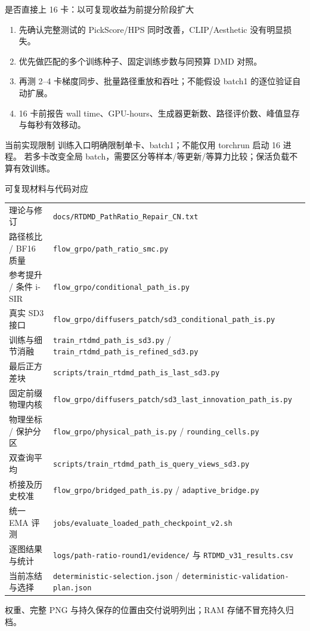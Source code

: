 \documentclass[10pt,aspectratio=169]{beamer}
\begin{document}
\begin{frame}{是否直接上 16 卡：以可复现收益为前提分阶段扩大}
\small
\begin{enumerate}\itemsep6pt
\item 先确认完整测试的 PickScore/HPS 同时改善，CLIP/Aesthetic 没有明显损失。
\item 优先做匹配的多个训练种子、固定训练步数与同预算 DMD 对照。
\item 再测 2--4 卡梯度同步、批量路径重放和吞吐；不能假设 batch1 的逐位验证自动扩展。
\item 16 卡前报告 wall time、GPU-hours、生成器更新数、路径评价数、峰值显存与每秒有效移动。
\end{enumerate}
\begin{alertblock}{当前实现限制}
训练入口明确限制单卡、batch1；不能仅用 torchrun 启动 16 进程。
若多卡改变全局 batch，需要区分等样本/等更新/等算力比较；保活负载不算有效训练。
\end{alertblock}
\end{frame}

\begin{frame}{可复现材料与代码对应}
\footnotesize
\begin{tabularx}{\textwidth}{lX}\toprule
理论与修订 & \texttt{docs/RTDMD\_PathRatio\_Repair\_CN.txt}\\
路径核比 / BF16 质量 & \texttt{flow\_grpo/path\_ratio\_smc.py}\\
参考提升 / 条件 i-SIR & \texttt{flow\_grpo/conditional\_path\_is.py}\\
真实 SD3 接口 & \texttt{flow\_grpo/diffusers\_patch/sd3\_conditional\_path\_is.py}\\
训练与细节消融 & \texttt{train\_rtdmd\_path\_is\_sd3.py} / \texttt{train\_rtdmd\_path\_is\_refined\_sd3.py}\\
最后正方差块 & \texttt{scripts/train\_rtdmd\_path\_is\_last\_sd3.py}\\
固定前缀物理内核 & \texttt{flow\_grpo/diffusers\_patch/sd3\_last\_innovation\_path\_is.py}\\
物理坐标 / 保护分区 & \texttt{flow\_grpo/physical\_path\_is.py} / \texttt{rounding\_cells.py}\\
双查询平均 & \texttt{scripts/train\_rtdmd\_path\_is\_query\_views\_sd3.py}\\
桥接及历史校准 & \texttt{flow\_grpo/bridged\_path\_is.py} / \texttt{adaptive\_bridge.py}\\
统一 EMA 评测 & \texttt{jobs/evaluate\_loaded\_path\_checkpoint\_v2.sh}\\
逐图结果与统计 & \texttt{logs/path-ratio-round1/evidence/} 与 \texttt{RTDMD\_v31\_results.csv}\\
当前冻结与选择 & \texttt{deterministic-selection.json} / \texttt{deterministic-validation-plan.json}\\
\bottomrule\end{tabularx}
\par\vspace{4pt}权重、完整 PNG 与持久保存的位置由交付说明列出；RAM 存储不冒充持久归档。
\end{frame}
\end{document}
